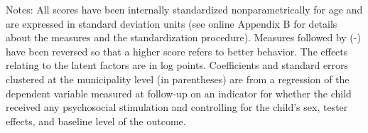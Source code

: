 \begin{table}
{\begin{threeparttable}
\begin{tablenotes}
\begin{footnotesize}
Notes:
All
scores
have
been
internally
standardized
nonparametrically
for
age
and
are
expressed
in
standard
deviation
units
(see
online
Appendix
B
for
details
about
the
measures
and
the
standardization
procedure).
Measures
followed
by
(-)
have
been
reversed
so
that
a
higher
score
refers
to
better
behavior.
The
effects
relating
to
the
latent
factors
are
in
log
points.
Coefficients
and
standard
errors
clustered
at
the
municipality
level
(in
parentheses)
are
from
a
regression
of
the
dependent
variable
measured
at
follow-up
on
an
indicator
for
whether
the
child
received
any
psychosocial
stimulation
and
controlling
for
the
child’s
sex,
tester
effects,
and
baseline
level
of
the
outcome.
\end{footnotesize}
\end{tablenotes} \end{threeparttable} } \end{table}
